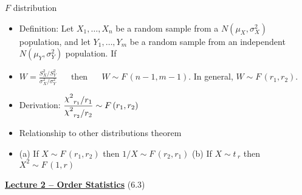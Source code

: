 \documentclass{article}
\newcommand{\bu}[1]{\textbf{\ul{#1}}}				%
\newcommand{\follow}[1]{\sim \text{#1}\,}		%
\newcommand{\vecn}[2]{#1_1, \ldots, #1_{#2}}	%
\newcommand{\chisq}{\raisebox{2pt}{$\chi^2$}}		%
\begin{document}
$F$ distribution
\begin{itemize}
    \item Definition: Let $\vecn{X}{n}$ be a random sample from a $N(\mu_X, \sigma^2_X)$ population, and let $\vecn{Y}{m}$ be a random sample from an independent $N(\mu_Y, \sigma^2_Y)$ population. If
    \item[] $\displaystyle W = \frac{S^2_X / S^2_Y}{\sigma^2_X / \sigma^2_Y} \hspace{20pt} \text{then} \hspace{20pt} W \follow{$F$}(n-1, m-1)$. In general, $W \follow{$F$}(r_1, r_2)$.
    \item Derivation: $\displaystyle \frac{\chisq_{r_1} / r_1}{\chisq_{r_2} / r_2} \follow{$F$}(r_1, r_2)$
    \item Relationship to other distributions theorem
    \item[] (a) If $X \follow{$F$}(r_1,r_2)$ then $1/X \follow{$F$}(r_2,r_1)$ \hspace{20pt} (b) If $X \follow{$t$}_r$ then $X^2 \follow{$F$}(1,r)$
\end{itemize}\bigskip

\vspace{50pt}

{\large \bu{Lecture 2 -- Order Statistics}} (6.3)\bigskip
\end{document}
